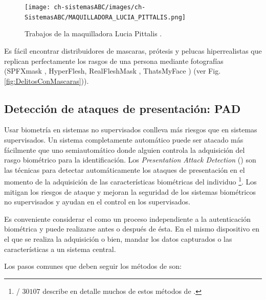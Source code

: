 \begin{figure}[t]
    \centering
    \texttt{[image: ch-sistemasABC/images/ch-SistemasABC/MAQUILLADORA\_LUCIA\_PITTALIS.png]}
    \caption{Trabajos de la maquilladora Lucia Pittalis \cite{LuciaPittalisOnline}.}
    \label{fig:Maquillajes}
\end{figure}


Es fácil encontrar distribuidores de mascaras, prótesis y pelucas hiperrealistas que replican perfectamente los rasgos de una persona mediante fotografías (SPFXmask \cite{spfxmaskOnline}, HyperFlesh\cite{HyperFleshOnline}, RealFleshMask \cite{RealFleshMaskhOnline}, ThatsMyFace \cite{ThatsMyFaceOnline}) (ver Fig. \ref{fig:DelitosConMascaras})).

\subsection{Detección de ataques de presentación: PAD}\label{sec:PAD}

Usar biometría en sistemas no supervisados conlleva más riesgos que en sistemas supervisados. Un sistema completamente automático puede ser atacado más fácilmente que uno semiautomático donde alguien controla la adquisición del rasgo biométrico para la identificación. Los \textit{Presentation Attack Detection} () son las técnicas para detectar automáticamente los ataques de presentación en el momento de la adquisición de las características biométricas del individuo \footnote{/ $30107$ describe en detalle muchos de estos métodos de  \cite{ISO/PADFramework}.}. Los  mitigan los riesgos de ataque y mejoran la seguridad de los sistemas biométricos no supervisados y ayudan en el control en los supervisados.

Es conveniente considerar el  como un proceso independiente a la autenticación biométrica y puede realizarse antes o después de ésta. En el mismo dispositivo en el que se realiza la adquisición o bien, mandar los datos capturados o las características a un sistema central. 

Los pasos comunes que deben seguir los métodos de  son:

